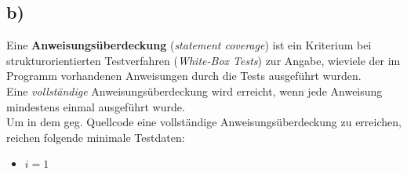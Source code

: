 \subsection*{b)}


Eine \textbf{Anweisungsüberdeckung} (\textit{statement coverage}) ist ein Kriterium bei strukturorientierten Testverfahren (\textit{White-Box Tests}) zur Angabe, wieviele der im Programm vorhandenen Anweisungen durch die Tests ausgeführt wurden.\\
Eine \textit{vollständige} Anweisungsüberdeckung wird erreicht, wenn jede Anweisung mindestens einmal ausgeführt wurde.\\

\noindent
Um in dem geg. Quellcode eine vollständige Anweisungsüberdeckung zu erreichen, reichen folgende minimale Testdaten:

\begin{itemize}
    \item $i=1$
\end{itemize}